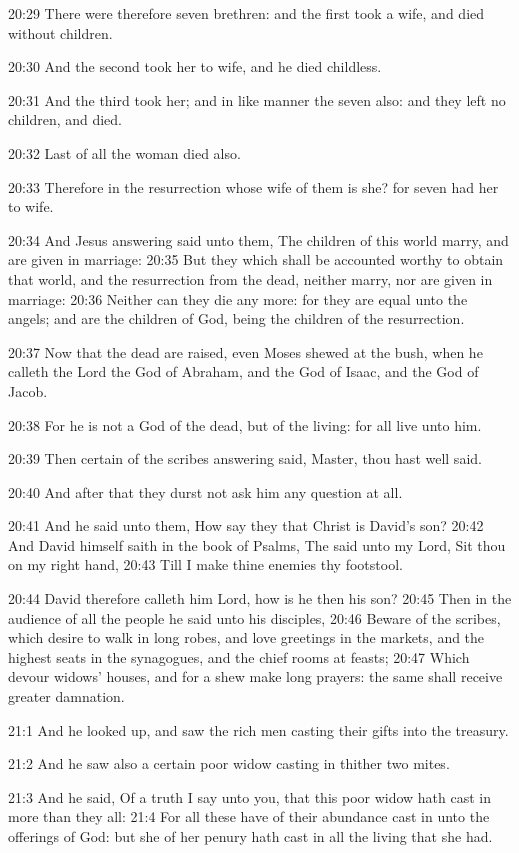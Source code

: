 20:29 There were therefore seven brethren: and the first took a wife, and died without children.

20:30 And the second took her to wife, and he died childless.

20:31 And the third took her; and in like manner the seven also: and they left no children, and died.

20:32 Last of all the woman died also.

20:33 Therefore in the resurrection whose wife of them is she? for seven had her to wife.

20:34 And Jesus answering said unto them, The children of this world marry, and are given in marriage: 20:35 But they which shall be accounted worthy to obtain that world, and the resurrection from the dead, neither marry, nor are given in marriage: 20:36 Neither can they die any more: for they are equal unto the angels; and are the children of God, being the children of the resurrection.

20:37 Now that the dead are raised, even Moses shewed at the bush, when he calleth the Lord the God of Abraham, and the God of Isaac, and the God of Jacob.

20:38 For he is not a God of the dead, but of the living: for all live unto him.

20:39 Then certain of the scribes answering said, Master, thou hast well said.

20:40 And after that they durst not ask him any question at all.

20:41 And he said unto them, How say they that Christ is David's son?  20:42 And David himself saith in the book of Psalms, The \LORD said unto my Lord, Sit thou on my right hand, 20:43 Till I make thine enemies thy footstool.

20:44 David therefore calleth him Lord, how is he then his son?  20:45 Then in the audience of all the people he said unto his disciples, 20:46 Beware of the scribes, which desire to walk in long robes, and love greetings in the markets, and the highest seats in the synagogues, and the chief rooms at feasts; 20:47 Which devour widows' houses, and for a shew make long prayers: the same shall receive greater damnation.

21:1 And he looked up, and saw the rich men casting their gifts into the treasury.

21:2 And he saw also a certain poor widow casting in thither two mites.

21:3 And he said, Of a truth I say unto you, that this poor widow hath cast in more than they all: 21:4 For all these have of their abundance cast in unto the offerings of God: but she of her penury hath cast in all the living that she had.

